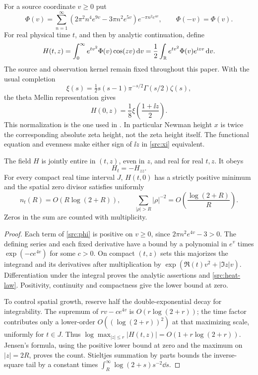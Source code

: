 For a source coordinate $v\ge0$ put
\begin{equation}
 \Phi(v)=\sum_{n=1}^{\infty}
 \left(2\pi^2n^4e^{9v}-3\pi n^2e^{5v}\right)
 e^{-\pi n^2e^{4v}},
 \qquad \Phi(-v)=\Phi(v).
 \label{src:phi}
\end{equation}
For real physical time $t$, and then by analytic continuation, define
\begin{equation}
 H(t,z)=\int_0^{\infty}e^{tv^2}\Phi(v)\cos(zv)\,\mathrm d v
       =\frac12\int_{\mathbb R}e^{tv^2}\Phi(v)e^{\mathrm i zv}\,\mathrm d v.
 \label{src:H}
\end{equation}
The source and observation kernel remain fixed throughout this paper.
With the usual completion
\[
 \xi(s)=\tfrac12s(s-1)\pi^{-s/2}\Gamma(s/2)\zeta(s),
\]
the theta Mellin representation gives
\begin{equation}
 H(0,z)=\frac18\xi\!\left(\frac{1+\ii z}{2}\right).
 \label{src:xi}
\end{equation}
This normalization is the one used in
\cite{Polymath2019,VCDCMManuscript}. In particular Newman height $x$
is twice the corresponding absolute zeta height, not the zeta height
itself. The functional equation and evenness make either sign of $\ii z$
in \eqref{src:xi} equivalent.

\begin{proposition}
\label{src:heat}
The field $H$ is jointly entire in $(t,z)$, even in $z$, and real for
real $t,z$. It obeys
\begin{equation}
 H_t=-H_{zz}.
 \label{src:heat-law}
\end{equation}
For every compact real time interval $J$, $H(t,0)$ has a strictly
positive minimum and the spatial zero divisor satisfies uniformly
\begin{equation}
 n_t(R)=O(R\log(2+R)),\qquad
 \sum_{|\rho|>R}|\rho|^{-2}
       =O\!\left(\frac{\log(2+R)}R\right).
 \label{src:count}
\end{equation}
Zeros in the sum are counted with multiplicity.
\end{proposition}

\begin{proof}
Each term of \eqref{src:phi} is positive on $v\ge0$, since
$2\pi n^2e^{4v}-3>0$. The defining series and each fixed derivative
have a bound by a polynomial in $e^v$ times
$\exp(-c e^{4v})$ for some $c>0$. On compact $(t,z)$ sets this
majorizes the integrand and its derivatives after multiplication by
$\exp(\Re(t)v^2+|\Im z|v)$. Differentiation under the integral
proves the analytic assertions and \eqref{src:heat-law}. Positivity,
continuity and compactness give the lower bound at zero.

To control spatial growth, reserve half the double-exponential decay
for integrability. The supremum of $rv-c e^{4v}$ is
$O(r\log(2+r))$; the time factor contributes only a lower-order
$O((\log(2+r))^2)$ at that maximizing scale, uniformly for $t\in J$.
Thus $\log\max_{|z|\le r}|H(t,z)|=O(1+r\log(2+r))$.
Jensen's formula, using the positive lower bound at zero and the
maximum on $|z|=2R$, proves the count. Stieltjes summation by parts
bounds the inverse-square tail by a constant times
$\int_R^\infty \log(2+s)s^{-2}\dd s$.
\end{proof}

